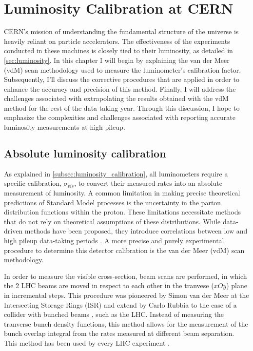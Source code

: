 \chapter{Luminosity Calibration at CERN}

CERN’s mission of understanding the fundamental structure of the universe is heavily reliant on particle accelerators. The effectiveness of the experiments conducted in these machines is closely tied to their luminosity, as detailed in \autoref{sec:luminosity}. In this chapter I will begin by explaining the van der Meer (vdM) scan methodology used to measure the luminometer's calibration factor. Subsequently, I'll discuss the corrective procedures that are applied in order to enhance the accuracy and precision of this method. Finally, I will address the challenges associated with extrapolating the results obtained with the vdM method for the rest of the data taking year. Through this discussion, I hope to emphasize the complexities and challenges associated with reporting accurate luminosity measurements at high pileup.

\section{Absolute luminosity calibration}
\label{sec:absolute_luminosity_calibration}

As explained in \autoref{subsec:luminosity_calibration}, all luminometers require a specific calibration, $\sigma_{vis}$, to convert their measured rates into an absolute measurement of luminosity. A common limitation in making precise theoretical predictions of Standard Model processes is the uncertainty in the parton distribution functions within the proton. These limitations necessitate methods that do not rely on theoretical assumptions of these distributions. While data-driven methods have been proposed, they introduce correlations between low and high pileup data-taking periods \cite{Salfeld-Nebgen_2018}. A more precise and purely experimental procedure to determine this detector calibration is the van der Meer (vdM) scan methodology.

In order to measure the visible cross-section, beam scans are performed, in which the 2 LHC beams are moved in respect to each other in the tranvese ($xOy$) plane in incremental steps. This procedure was pioneered by Simon van der Meer at the Intersecting Storage Rings (ISR) \cite{vanderMeer:296752} and extend by Carlo Rubbia to the case of a collider with bunched beams \cite{Rubbia:1025746}, such as the LHC. Instead of measuring the tranverse bunch density functions, this method allows for the measurement of the bunch overlap integral from the rates measured at different beam separation. This method has been used by every LHC experiment \cite{TheLHCbcollaboration_2014, ALICE-PUBLIC-2021-001, Maettig:1513982, Sirunyan:2759951}.

